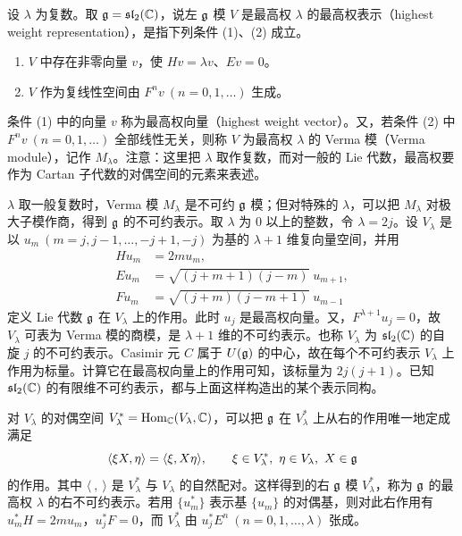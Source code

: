
设 $\lambda$ 为复数。取 $\mathfrak{g}=\mathfrak{sl}_2(\mathbb{C})$，说左 $\mathfrak{g}$ 模 $V$ 是最高权 $\lambda$ 的最高权表示（highest weight representation），是指下列条件 (1)、(2) 成立。
\begin{enumerate}[label=(\arabic*),leftmargin=2.2em,itemsep=2pt]
  \item $V$ 中存在非零向量 $v$，使 $Hv=\lambda v$、$Ev=0$。
  \item $V$ 作为复线性空间由 $F^nv\ (n=0,1,\dots)$ 生成。
\end{enumerate}
条件 (1) 中的向量 $v$ 称为最高权向量（highest weight vector）。又，若条件 (2) 中 $F^nv\ (n=0,1,\dots)$ 全部线性无关，则称 $V$ 为最高权 $\lambda$ 的 Verma 模（Verma module），记作 $M_\lambda$。注意：这里把 $\lambda$ 取作复数，而对一般的 Lie 代数，最高权要作为 Cartan 子代数的对偶空间的元素来表述。

$\lambda$ 取一般复数时，Verma 模 $M_\lambda$ 是不可约 $\mathfrak{g}$ 模；但对特殊的 $\lambda$，可以把 $M_\lambda$ 对极大子模作商，得到 $\mathfrak{g}$ 的不可约表示。取 $\lambda$ 为 $0$ 以上的整数，令 $\lambda=2j$。设 $V_\lambda$ 是以 $u_m\ (m=j,j-1,\dots,-j+1,-j)$ 为基的 $\lambda+1$ 维复向量空间，并用
\begin{align*}
  Hu_m&=2mu_m,\\
  Eu_m&=\sqrt{(j+m+1)(j-m)}\;u_{m+1},\\
  Fu_m&=\sqrt{(j+m)(j-m+1)}\;u_{m-1}
\end{align*}
定义 Lie 代数 $\mathfrak{g}$ 在 $V_\lambda$ 上的作用。此时 $u_j$ 是最高权向量。又，$F^{\lambda+1}u_j=0$，故 $V_\lambda$ 可表为 Verma 模的商模，是 $\lambda+1$ 维的不可约表示。也称 $V_\lambda$ 为 $\mathfrak{sl}_2(\mathbb{C})$ 的自旋 $j$ 的不可约表示。Casimir 元 $C$ 属于 $U(\mathfrak{g})$ 的中心，故在每个不可约表示 $V_\lambda$ 上作用为标量。计算它在最高权向量上的作用可知，该标量为 $2j(j+1)$。已知 $\mathfrak{sl}_2(\mathbb{C})$ 的有限维不可约表示，都与上面这样构造出的某个表示同构。

对 $V_\lambda$ 的对偶空间 $V_\lambda^*=\operatorname{Hom}_{\mathbb{C}}(V_\lambda,\mathbb{C})$，可以把 $\mathfrak{g}$ 在 $V_\lambda^*$ 上从右的作用唯一地定成满足
\[
  \langle\xi X,\eta\rangle=\langle\xi,X\eta\rangle,\qquad
  \xi\in V_\lambda^*,\ \eta\in V_\lambda,\ X\in\mathfrak{g}
\]
的作用。其中 $\langle\ ,\ \rangle$ 是 $V_\lambda^*$ 与 $V_\lambda$ 的自然配对。这样得到的右 $\mathfrak{g}$ 模 $V_\lambda^*$，称为 $\mathfrak{g}$ 的最高权 $\lambda$ 的右不可约表示。若用 $\{u_m^*\}$ 表示基 $\{u_m\}$ 的对偶基，则对此右作用有 $u_m^*H=2mu_m$，$u_j^*F=0$，而 $V_\lambda^*$ 由 $u_j^*E^n\ (n=0,1,\dots,\lambda)$ 张成。

